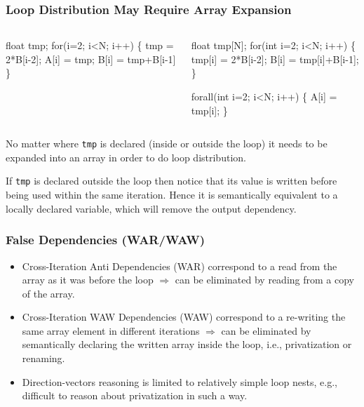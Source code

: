 \documentclass{beamer}
\renewcommand{\emph}[1]{\textcolor{structure}{#1}}
\newcommand{\emp}[1]{\textcolor{DikuRed}{ #1}}
\begin{document}
\begin{frame}[fragile,t]
  \frametitle{Loop Distribution May Require Array Expansion} 


\begin{columns}
\begin{colorcode}[fontsize=\scriptsize]
  float tmp;
  for(i=2; i<N; i++) \{
    \emp{tmp} = 2*B[i-2]; 
    A[i] = tmp;
    B[i] = tmp+B[i-1]
  \}
\end{colorcode}
\begin{colorcode}[fontsize=\scriptsize]
  \emph{float tmp[N]};
  for(int i=2; i<N; i++) \{
    tmp[i] = 2*B[i-2]; 
    B[i] = tmp[i]+B[i-1];
  \}

  \emph{forall(int i=2; i<N; i++)} \{
    A[i] = tmp[i];
  \}
\end{colorcode}
\end{columns}
\bigskip

No matter where {\tt tmp} is declared (inside or outside
the loop) it needs to be expanded into an array in order
to do loop distribution.\bigskip

If {\tt tmp} is declared outside the loop then notice that
its value is written before being used within the same iteration.
Hence it is semantically equivalent to a locally declared variable,
which will remove the output dependency.  

\end{frame}


\begin{frame}[fragile,t]
  \frametitle{False Dependencies (WAR/WAW)} 

\begin{itemize}
    \item \emp{Cross-Iteration Anti Dependencies (WAR)} 
        correspond to a read from the array as it was 
        before the loop $\Rightarrow$ can be eliminated
        by reading from a copy of the array.\bigskip

    \item \emp{Cross-Iteration WAW Dependencies (WAW)}
        correspond to a re-writing the same array element
        in different iterations $\Rightarrow$ can be eliminated
        by semantically declaring the written array inside
        the loop, i.e., privatization or renaming.\bigskip

    \item Direction-vectors reasoning is limited to relatively
        simple loop nests, e.g., difficult to reason about 
        privatization in such a way.
\end  {itemize}
\end{frame}
\end{document}

